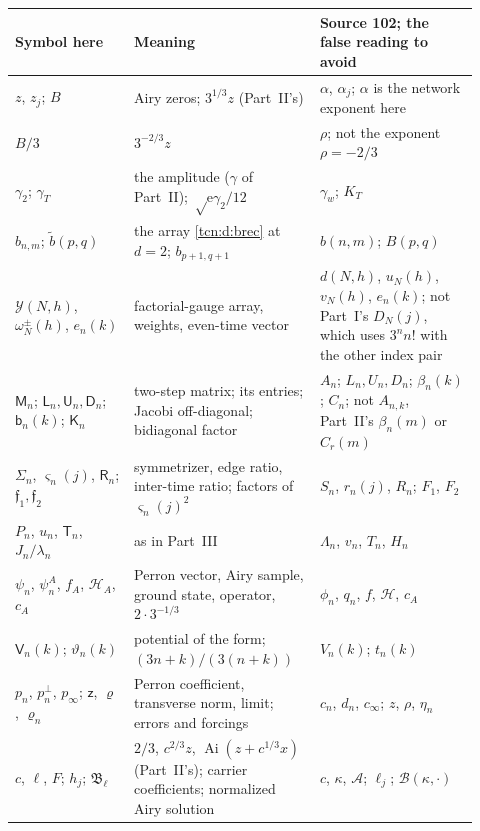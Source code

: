 \documentclass[11pt,letterpaper]{article}
\newcommand{\Ai}{\operatorname{Ai}}
\newcommand{\ee}{\mathrm e}
\theoremstyle{remark}
\begin{document}
\begingroup\small
\begin{longtable}{@{}>{\raggedright}p{0.24\linewidth}>{\raggedright}p{0.36\linewidth}>{\raggedright\arraybackslash}p{0.32\linewidth}@{}}
\toprule
Symbol here & Meaning & Source 102; the false reading to avoid\\
\midrule\endhead
$z$, $z_j$; $B$ & Airy zeros; $3^{1/3}z$ (Part~II's) & $\alpha$, $\alpha_j$; $\alpha$ is the network exponent here\\
$B/3$ & $3^{-2/3}z$ & $\rho$; not the exponent $\rho=-2/3$\\
$\gamma_2$; $\gamma_T$ & the amplitude ($\gamma$ of Part~II); $\sqrt\ee\gamma_2/12$ & $\gamma_w$; $K_T$\\
$b_{n,m}$; $\widetilde b(p,q)$ & the array \eqref{tcn:d:brec} at $d=2$; $b_{p+1,q+1}$ & $b(n,m)$; $B(p,q)$\\
$\mathcal Y(N,h)$, $\omega^\pm_N(h)$, $e_n(k)$ & factorial-gauge array, weights, even-time vector & $d(N,h)$, $u_N(h)$, $v_N(h)$, $e_n(k)$; not Part~I's $D_N(j)$, which uses $3^nn!$ with the other index pair\\
$\mathsf M_n$; $\mathsf L_n,\mathsf U_n,\mathsf D_n$; $\mathsf b_n(k)$; $\mathsf K_n$ & two-step matrix; its entries; Jacobi off-diagonal; bidiagonal factor & $A_n$; $L_n,U_n,D_n$; $\beta_n(k)$; $C_n$; not $A_{n,k}$, Part~II's $\beta_n(m)$ or $C_r(m)$\\
$\Sigma_n$, $\varsigma_n(j)$, $\mathsf R_n$; $\mathfrak f_1,\mathfrak f_2$ & symmetrizer, edge ratio, inter-time ratio; factors of $\varsigma_n(j)^2$ & $S_n$, $r_n(j)$, $R_n$; $F_1$, $F_2$\\
$P_n$, $u_n$, $\mathsf T_n$, $J_n/\lambda_n$ & as in Part~III & $\Lambda_n$, $v_n$, $T_n$, $H_n$\\
$\psi_n$, $\psi^A_n$, $f_A$, $\mathcal H_A$, $c_A$ & Perron vector, Airy sample, ground state, operator, $2\cdot3^{-1/3}$ & $\phi_n$, $q_n$, $f$, $\mathcal H$, $c_A$\\
$\mathsf V_n(k)$; $\vartheta_n(k)$ & potential of the form; $(3n+k)/(3(n+k))$ & $V_n(k)$; $t_n(k)$\\
$p_n$, $p_n^\perp$, $p_\infty$; $\mathsf z$, $\varrho$, $\varrho_n$ & Perron coefficient, transverse norm, limit; errors and forcings & $c_n$, $d_n$, $c_\infty$; $z$, $\rho$, $\eta_n$\\
$c$, $\ell$, $F$; $h_j$; $\mathfrak B_\ell$ & $2/3$, $c^{2/3}z$, $\Ai(z+c^{1/3}x)$ (Part~II's); carrier coefficients; normalized Airy solution & $c$, $\kappa$, $\mathcal A$; $\ell_j$; $\mathcal B(\kappa,\cdot)$\\

\end{longtable}
\end{document}
